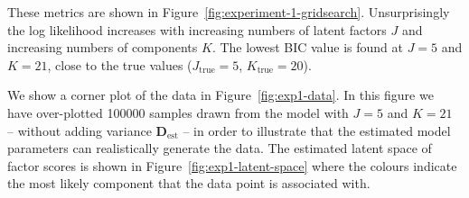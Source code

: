 \documentclass[twocolumn]{aastex61}
\newcommand{\vect}[1]{\boldsymbol{\mathbf{#1}}}
\renewcommand{\vec}[1]{\vect{#1}}
\newcommand{\data}{\textbf{Y}}
\newcommand{\specificvariance}{\vec{D}}
\newcommand{\NumLatentFactors}{J}
\newcommand{\NumComponents}{K}
\begin{document}
These metrics are shown in Figure~\ref{fig:experiment-1-gridsearch}.
Unsurprisingly the log likelihood increases with increasing numbers of latent
factors $\NumLatentFactors$ and increasing numbers of components $\NumComponents$.
The lowest BIC value is found at $\NumLatentFactors = 5$
and $\NumComponents = 21$, close to the true values ($\NumLatentFactors_\textrm{true} = 5$,
$\NumComponents_\textrm{true} = 20$). 

We show a corner plot of the data in Figure~\ref{fig:exp1-data}.
In this figure we have over-plotted 100000 samples drawn from the model
with $J = 5$ and $K = 21$
-- without adding variance $\specificvariance_\textrm{est}$ %
-- in order to illustrate that the
estimated model parameters can realistically generate the data.
The estimated latent space of factor scores is shown in 
Figure~\ref{fig:exp1-latent-space} where the colours indicate the
most likely component that the data point is associated with.


\end{document}
